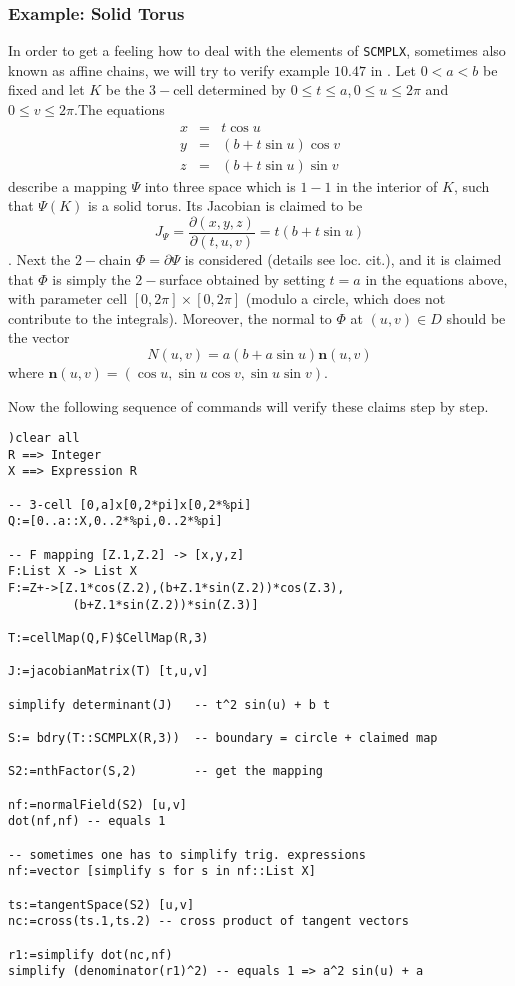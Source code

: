 \documentclass[12pt,a4paper]{article}
\begin{document}
\subsubsection{Example: Solid Torus}
In order to get a feeling how to deal with the elements of {\tt SCMPLX},
sometimes also known as affine chains, we will try to verify example
$10.47$ in \cite{PMA}.
Let $0<a<b$ be fixed and let $K$ be the $3-$cell determined by 
$0\leq t\leq a$,\,$0\leq u\leq 2\pi$ and $0\leq v\leq 2\pi$.The
equations
\begin{eqnarray*}
x &=& t \cos u \\
y &=& (b+t \sin u) \cos v \\
z &=& (b+t \sin u) \sin v
\end{eqnarray*}
describe a mapping $\Psi$ into three space which is $1-1$ in the interior
of $K$, such that $\Psi(K)$ is a solid torus. Its Jacobian is claimed to
be
\begin{displaymath}
  J_\Psi = \frac{\partial(x,y,z)}{\partial(t,u,v)}=t(b+t\sin u)
\end{displaymath}.
Next the $2-$chain $\Phi=\partial\Psi$ is considered (details see loc. cit.),
and it is claimed that $\Phi$ is simply the $2-$surface obtained by setting
$t=a$ in the equations above, with parameter cell $[0,2\pi]\times[0,2\pi]$
(modulo a circle, which does not contribute to the integrals).
Moreover, the normal to $\Phi$ at $(u,v)\in D$ should be the vector
\begin{displaymath}
   N(u,v) = a(b+a\sin u) \mathbf{n}(u,v)
\end{displaymath}
where $\mathbf{n}(u,v)=(\cos u, \sin u \cos v, \sin u \sin v)$.

Now the following sequence of commands will verify these claims
step by step.
\begin{lstlisting}
)clear all
R ==> Integer
X ==> Expression R

-- 3-cell [0,a]x[0,2*pi]x[0,2*%pi]
Q:=[0..a::X,0..2*%pi,0..2*%pi]

-- F mapping [Z.1,Z.2] -> [x,y,z]
F:List X -> List X
F:=Z+->[Z.1*cos(Z.2),(b+Z.1*sin(Z.2))*cos(Z.3),
         (b+Z.1*sin(Z.2))*sin(Z.3)]

T:=cellMap(Q,F)$CellMap(R,3)

J:=jacobianMatrix(T) [t,u,v]

simplify determinant(J)   -- t^2 sin(u) + b t

S:= bdry(T::SCMPLX(R,3))  -- boundary = circle + claimed map

S2:=nthFactor(S,2)        -- get the mapping

nf:=normalField(S2) [u,v]  
dot(nf,nf) -- equals 1

-- sometimes one has to simplify trig. expressions
nf:=vector [simplify s for s in nf::List X]

ts:=tangentSpace(S2) [u,v]
nc:=cross(ts.1,ts.2) -- cross product of tangent vectors

r1:=simplify dot(nc,nf)
simplify (denominator(r1)^2) -- equals 1 => a^2 sin(u) + a 
\end{lstlisting}
\end{document}
